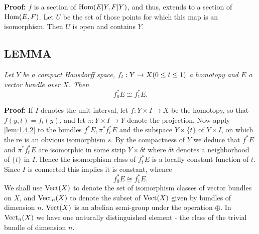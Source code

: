 \textbf{Proof:} $f$ is a section of $\operatorname{Hom}(E \vert Y, F \vert Y)$, and thus, extends to a section of $\operatorname{Hom}(E, F)$. Let $U$ be the set of those points for which this map is an isomorphism. Then $U$ is open and contains $Y$.

\subsection{LEMMA} \textit{Let $Y$ be a compact Hausdorff space, $f_t: Y \to X \\ (0 \leq t \leq 1)$ a homotopy and $E$ a vector bundle over $X$. Then}
\begin{equation}
f_0^*E \cong f_1^*E.
\end{equation}

\textbf{Proof:} If $I$ denotes the unit interval, let $f: Y \times I \to X$ be the homotopy, so that $f(y, t) = f_t(y)$, and let $\pi: Y \times I \to Y$ denote the projection. Now apply \ref{lem:1.4.2} to the bundles $f^*E, \pi^* f_t^* E$ and the subspace $Y \times \{t\}$ of $Y \times I$, on which the re is an obvious isomorphism $s$. By the compactness of $Y$ we deduce that $f^*E$ and $\pi^* f_t^* E$ are isomorphic in some strip $Y \times \delta t$ where $\delta t$ denotes a neighborhood of $\{t\}$ in $I$. Hence the isomorphism class of $f_t^*E$ is a locally constant function of $t$. Since $I$ is connected this implies it is constant, whence
\begin{equation}
f_0^*E \cong f_1^*E.
\end{equation}
We shall use $\operatorname{Vect}(X)$ to denote the set of isomorphism classes of vector bundles on $X$, and $\operatorname{Vect}_n(X)$ to denote the subset of $\operatorname{Vect}(X)$ given by bundles of dimension $n$. $\operatorname{Vect}(X)$ is an abelian semi-group under the operation $\oplus$. In $\operatorname{Vect}_n(X)$ we have one naturally distinguished element - the class of the trivial bundle of dimension $n$.
